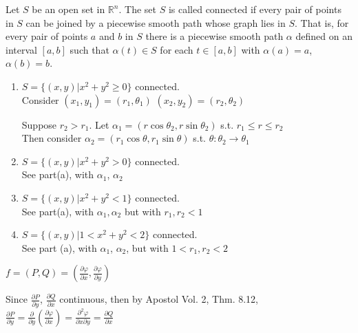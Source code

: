 \documentclass[twoside]{amsart}
\theoremstyle{plain}
\theoremstyle{definition}
\newcommand{\exercisehead}[1]
  {
   \noindent{\small\bf Exercise #1.}
   \smallskip}
\begin{document}
Let $S$ be an open set in $\mathbb{R}^n$.  The set $S$ is called connected if every pair of points in $S$ can be joined by a piecewise smooth path whose graph lies in $S$.  That is, for every pair of points $a$ and $b$ in $S$ there is a piecewise smooth path $\alpha$ defined on an interval $[a,b]$ such that $\alpha(t) \in S$ for each $t \in [a,b]$ with $\alpha(a) = a$, $\alpha(b) = b$.  

\begin{enumerate}
\item $S = \{ (x,y) | x^2 + y^2 \geq 0 \}$ connected.  \\
Consider $(x_1,y_1) = (r_1,\theta_1)$  $(x_2,y_2) = (r_2,\theta_2)$  

Suppose $r_2>r_1$.  Let $\alpha_1 = (r\cos{\theta_2}, r \sin{\theta_2})$ s.t. $r_1 \leq r \leq r_2$  \\
Then consider $\alpha_2 = (r_1 \cos{\theta}, r_1 \sin{\theta})$ s.t. $\theta: \theta_2 \to \theta_1$  
\item $S = \{ (x,y) | x^2 + y^2 > 0 \}$ connected.  \\
See part(a), with $\alpha_1$, $\alpha_2$  
\item $S = \{ (x,y) | x^2 + y^2 < 1 \}$ connected.  \\
See part(a), with $\alpha_1, \alpha_2$ but with $r_1,r_2 <1$  
\item $S = \{ (x,y) | 1 < x^2 + y^2 < 2 \}$ connected.  \\
See part (a), with $\alpha_1$, $\alpha_2$, but with $1 < r_1,r_2 <2$  
\end{enumerate}

\exercisehead{2} $f = (P,Q) = \left( \frac{ \partial \varphi}{\partial x }, \frac{ \partial \varphi}{ \partial y } \right)$  

Since $\frac{ \partial P}{\partial y}$, $\frac{ \partial Q}{ \partial x}$ continuous, then by Apostol Vol. 2, Thm. 8.12, $\frac{ \partial P}{\partial y} = \frac{ \partial }{ \partial y} \left( \frac{ \partial \varphi }{ \partial x} \right)  = \frac{ \partial^2 \varphi }{ \partial x \partial y} = \frac{ \partial Q}{ \partial x} $  
\end{document}
